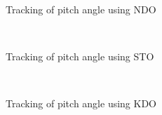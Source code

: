 \documentclass[letterpaper%
, twoside%
, 12pt%
,memoire%
, english%
,creativecommons,hyperref%
]{thETS}
\begin{document}
\begin{figure}[H]
\centering
{}
\\ \parbox{0.75\textwidth}{\caption{Tracking of pitch angle using NDO}
\label{pitch_trac_dis_m1_ndo}}
\end{figure}

\begin{figure}[H]
\centering
{}
\\ \parbox{0.75\textwidth}{\caption{Tracking of pitch angle using STO}
\label{pitch_trac_dis_m1_sto}}
\end{figure}

\begin{figure}[H]
\centering
{}
\\ \parbox{0.75\textwidth}{\caption{Tracking of pitch angle using KDO}
\label{pitch_trac_dis_m1_kdo}}
\end{figure}
\end{document}
